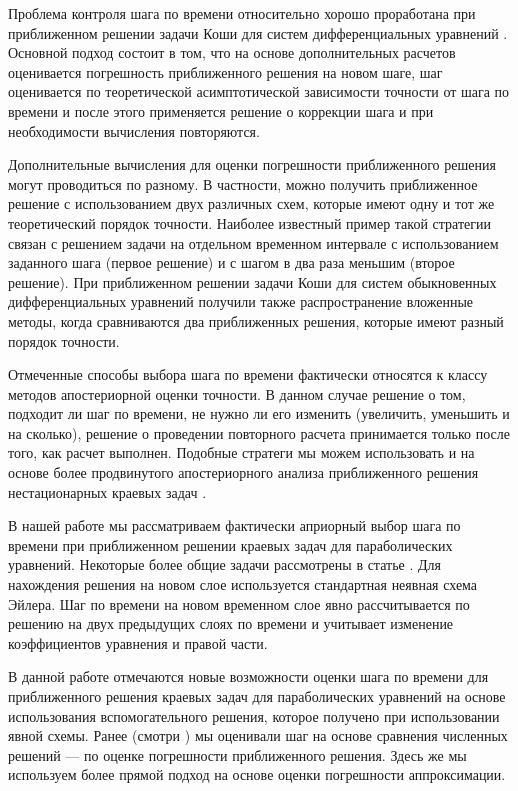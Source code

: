 \documentclass[12pt]{ncc}
\numberwithin{equation}{section}
\begin{document}
Проблема контроля шага по времени относительно хорошо проработана
при приближенном решении задачи Коши для систем дифференциальных уравнений
\cite{ascher1998computer,Gear1971,HairerNorsettWanner1987}.
Основной подход состоит в том, что на основе дополнительных расчетов
оценивается погрешность приближенного решения на новом шаге, шаг оценивается 
по теоретической асимптотической зависимости точности от шага по времени и 
после этого применяется решение о коррекции шага и при необходимости вычисления повторяются.

Дополнительные вычисления для оценки погрешности приближенного решения 
могут проводиться по разному. В частности, можно получить приближенное решение
с использованием двух различных схем, которые имеют одну и тот же теоретический порядок точности.
Наиболее известный пример такой стратегии связан с решением задачи на отдельном временном интервале
с использованием заданного шага (первое решение) и  с шагом в два раза меньшим (второе решение). 
При приближенном решении задачи Коши для систем обыкновенных дифференциальных уравнений
получили также распространение вложенные методы, когда сравниваются два приближенных решения,
которые имеют разный порядок точности.

Отмеченные способы выбора шага по времени фактически относятся к классу методов апостериорной оценки
точности. В данном случае решение о том, подходит ли шаг по времени, не нужно ли его изменить (увеличить,
уменьшить и на сколько), решение о проведении повторного расчета 
принимается только после того, как расчет выполнен. 
Подобные стратеги мы можем использовать и на основе более продвинутого апостериорного
анализа приближенного решения нестационарных краевых задач 
\cite{bangerth2003adaptive,moller2011adaptive,verfurth2013posteriori}.

В нашей работе \cite{vabishchevich2015priori}  мы рассматриваем фактически априорный выбор шага по времени при приближенном
решении краевых задач для параболических уравнений. Некоторые более общие задачи
рассмотрены в статье \cite{vabishchevich2015time}.
Для нахождения решения на новом слое используется стандартная неявная схема Эйлера.
Шаг по времени на новом временном слое явно рассчитывается по решению на двух 
предыдущих слоях по времени и учитывает изменение
коэффициентов уравнения и правой части.

В данной работе отмечаются новые возможности оценки шага по времени
для приближенного решения краевых задач для параболических уравнений
на основе использования вспомогательного решения, которое 
получено при использовании явной схемы. Ранее 
(смотри \cite{vabishchevich2015priori,vabishchevich2015time} ) мы оценивали шаг 
на основе сравнения численных решений --- по оценке погрешности приближенного
решения. Здесь же мы используем более прямой подход на основе оценки погрешности аппроксимации.
 
\end{document}
